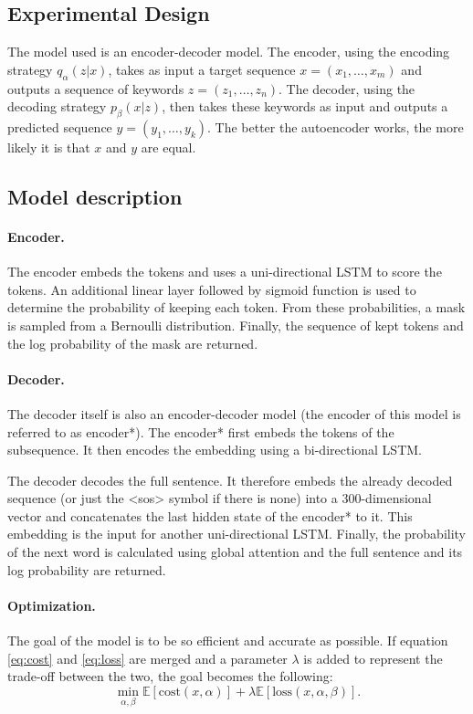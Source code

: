 \documentclass[a4paper, 12pt]{report}
\begin{document}
\subsection{Experimental Design}
The model used is an encoder-decoder model.
The encoder, using the encoding strategy $q_{\alpha}(z|x)$, takes as input a target sequence $x = (x_1, \dots, x_m)$ and outputs a sequence of keywords $z = (z_1, \dots, z_n)$.
The decoder, using the decoding strategy $p_{\beta}(x|z)$, then takes these keywords as input and outputs a predicted sequence $y = (y_1, \dots, y_k)$. 
The better the autoencoder works, the more likely it is that $x$ and $y$ are equal. 

\subsection{Model description}
\paragraph{Encoder.} 
The encoder embeds the tokens and uses a uni-directional LSTM to score the tokens.
An additional linear layer followed by sigmoid function is used to determine the probability of keeping each token. 
From these probabilities, a mask is sampled from a Bernoulli distribution. 
Finally, the sequence of kept tokens and the log probability of the mask are returned.

\paragraph{Decoder.} 
The decoder itself is also an encoder-decoder model (the encoder of this model is referred to as encoder*).
The encoder* first embeds the tokens of the subsequence.
It then encodes the embedding using a bi-directional LSTM. 

The decoder decodes the full sentence. 
It therefore embeds the already decoded sequence (or just the <sos> symbol if there is none) into a 300-dimensional vector and concatenates the last hidden state of the encoder* to it. 
This embedding is the input for another uni-directional LSTM. 
Finally, the probability of the next word is calculated using global attention and the full sentence and its log probability are returned. 

\paragraph{Optimization.} 
The goal of the model is to be so efficient and accurate as possible. 
If equation \ref{eq:cost} and \ref{eq:loss} are merged and a parameter $\lambda$ is added to represent the trade-off between the two, the goal becomes the following:
\begin{equation}
    \min_{\alpha, \beta} \mathbb{E} [\text{cost}(x, \alpha)] + \lambda \mathbb{E}[\text{loss}(x, \alpha, \beta)].
\end{equation}
\end{document}
